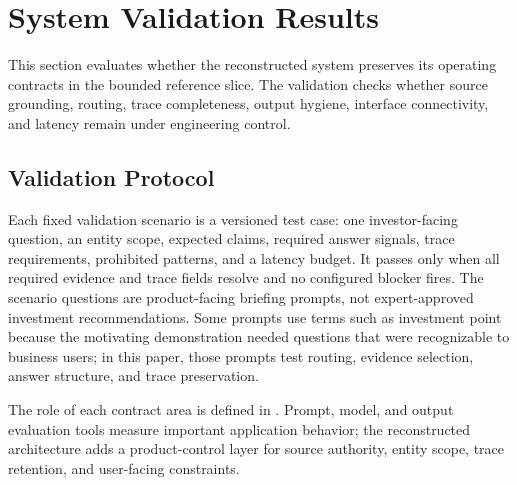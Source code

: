 \PostFigureHeadingSpace
\section{System Validation Results}

This section evaluates whether the reconstructed system preserves its operating contracts in the bounded reference slice. The validation checks whether source grounding, routing, trace completeness, output hygiene, interface connectivity, and latency remain under engineering control.

\subsection{Validation Protocol}

Each fixed validation scenario is a versioned test case: one investor-facing question, an entity scope, expected claims, required answer signals, trace requirements, prohibited patterns, and a latency budget. It passes only when all required evidence and trace fields resolve and no configured blocker fires.
The scenario questions are product-facing briefing prompts, not expert-approved investment recommendations. Some prompts use terms such as investment point because the motivating demonstration needed questions that were recognizable to business users; in this paper, those prompts test routing, evidence selection, answer structure, and trace preservation.

The role of each contract area is defined in . Prompt, model, and output evaluation tools measure important application behavior; the reconstructed architecture adds a product-control layer for source authority, entity scope, trace retention, and user-facing constraints.

